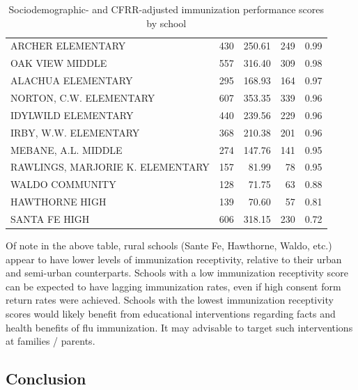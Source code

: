\documentclass{article}
\begin{document}
\begin{table}[H]
\begin{table}[ht]
{\begin{tabular}{lrrrr}
  ARCHER ELEMENTARY  & 430 & 250.61 & 249 & 0.99 \\ 
  OAK VIEW MIDDLE  & 557 & 316.40 & 309 & 0.98 \\ 
  ALACHUA ELEMENTARY & 295 & 168.93 & 164 & 0.97 \\ 
  NORTON, C.W. ELEMENTARY & 607 & 353.35 & 339 & 0.96 \\ 
  IDYLWILD ELEMENTARY & 440 & 239.56 & 229 & 0.96 \\ 
  IRBY, W.W. ELEMENTARY & 368 & 210.38 & 201 & 0.96 \\ 
  MEBANE, A.L. MIDDLE  & 274 & 147.76 & 141 & 0.95 \\ 
  RAWLINGS, MARJORIE K. ELEMENTARY & 157 & 81.99 &  78 & 0.95 \\ 
  WALDO COMMUNITY  & 128 & 71.75 &  63 & 0.88 \\ 
  HAWTHORNE HIGH  & 139 & 70.60 &  57 & 0.81 \\ 
  SANTA FE HIGH  & 606 & 318.15 & 230 & 0.72 \\ 
   \hline
\end{tabular}
}
\caption{Sociodemographic- and CFRR-adjusted immunization performance scores by school} 
\end{table}\end{table}


Of note in the above table, rural schools (Sante Fe, Hawthorne, Waldo, etc.) appear to have lower levels of immunization receptivity, relative to their urban and semi-urban counterparts.  Schools with a low immunization receptivity score can be expected to have lagging immunization rates, even if high consent form return rates were achieved.  Schools with the lowest immunization receptivity scores would likely benefit from educational interventions regarding facts and health benefits of flu immunization. It may advisable to target such interventions at families / parents. 



\begin{center}
\section*{Conclusion}
\end{center}
\end{document}
